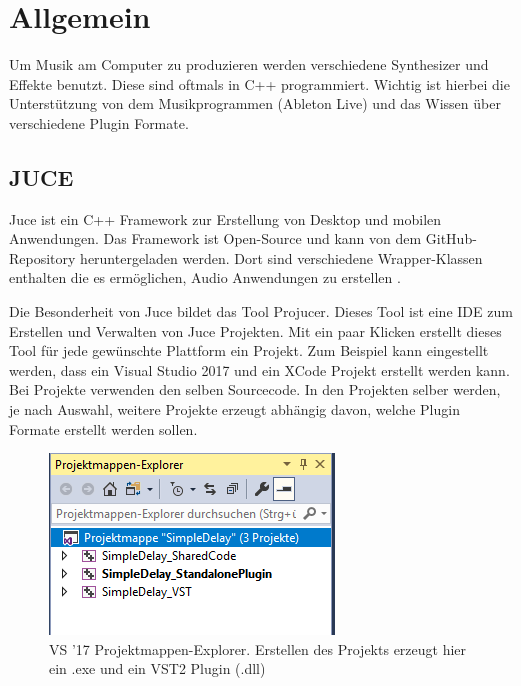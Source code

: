 \chapter{Allgemein}



Um Musik am Computer zu produzieren werden verschiedene Synthesizer und Effekte benutzt. Diese sind oftmals in C++ programmiert. Wichtig ist hierbei die Unterstützung von dem Musikprogrammen (Ableton Live) und das Wissen über verschiedene Plugin Formate.

\section{JUCE}

Juce ist ein C++ Framework zur Erstellung von Desktop und mobilen Anwendungen. Das Framework ist Open-Source und kann von dem GitHub-Repository heruntergeladen werden. Dort sind verschiedene Wrapper-Klassen enthalten die es ermöglichen, Audio Anwendungen zu erstellen \cite{JUCE}. 

Die Besonderheit von Juce bildet das Tool Projucer. Dieses Tool ist eine IDE zum Erstellen und Verwalten von Juce Projekten. Mit ein paar Klicken erstellt dieses Tool für jede gewünschte Plattform ein Projekt. Zum Beispiel kann eingestellt werden, dass ein Visual Studio 2017 und ein XCode Projekt erstellt werden kann. Bei Projekte verwenden den selben Sourcecode. In den Projekten selber werden, je nach Auswahl, weitere Projekte erzeugt abhängig davon, welche Plugin Formate erstellt werden sollen.

\begin{figure}
	\centering
	\includegraphics[width=0.7\linewidth]{images/projektmappe}
	\caption{VS '17 Projektmappen-Explorer. Erstellen des Projekts erzeugt hier ein .exe und ein VST2 Plugin (.dll)}
	\label{fig:projektmappe}
\end{figure}

